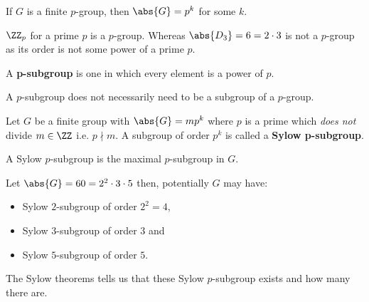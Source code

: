 \documentclass[12pt, a4paper]{article}
\begin{document}
\begin{mdremark}
    If \(G\) is a finite \(p\)-group, then \(\abs{G}=p^k\) for some \(k\).
\end{mdremark}

\begin{example}
    \(\ZZ_p\) for a prime \(p\) is a \(p\)-group. Whereas \(\abs{D_3}= 6= 2 \cdot 3\) is not a \(p\)-group as its order is not some power of a prime \(p\).
\end{example}

\begin{definition}
    A \textbf{p-subgroup} is one in which every element is a power of \(p\).
\end{definition}

\begin{mdremark}
    A \(p\)-subgroup does not necessarily need to be a subgroup of a \(p\)-group.
\end{mdremark}

\begin{definition}
    Let \(G\) be a finite group with \(\abs{G}=mp^k\) where \(p\) is a prime which \textit{does not} divide \(m \in \ZZ\) i.e. \(p \nmid m\). A subgroup of order \(p^k\) is called a \textbf{Sylow p-subgroup}.
\end{definition}

\begin{mdremark}
    A Sylow \(p\)-subgroup is the maximal \(p\)-subgroup in \(G\).
\end{mdremark}

\begin{mdexample}
    Let \(\abs{G} = 60 = 2^2 \cdot 3 \cdot 5\) then, potentially \(G\) may have:
    \begin{itemize}
        \item Sylow \(2\)-subgroup of order \(2^2 =4\),
        \item Sylow \(3\)-subgroup of order \(3\) and
        \item Sylow \(5\)-subgroup of order \(5\).
    \end{itemize}
    The Sylow theorems tells us that these Sylow \(p\)-subgroup exists and how many there are.
\end{mdexample}
\end{document}
